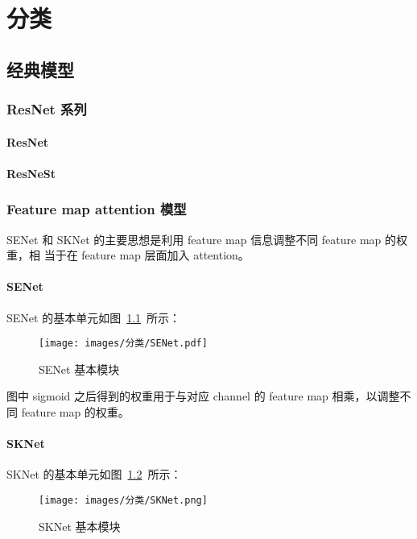 \part{分类}

\chapter{经典模型}

\section{ResNet 系列}

\subsection{ResNet}\label{subsec:ResNet}

\subsection{ResNeSt}

\section{Feature map attention 模型}
SENet 和 SKNet 的主要思想是利用 feature map 信息调整不同 feature map 的权重，相
当于在 feature map 层面加入 attention。

\subsection{SENet}\label{subsec:SENet}
SENet 的基本单元如图~\ref{fig:senet}~所示：

\begin{figure}[ht]
  \centering
  \texttt{[image: images/分类/SENet.pdf]}
  \caption{SENet 基本模块}\label{fig:senet}
\end{figure}

图中 sigmoid 之后得到的权重用于与对应 channel 的 feature map 相乘，以调整不
同 feature map 的权重。

\subsection{SKNet}
SKNet 的基本单元如图~\ref{fig:sknet}~所示：

\begin{figure}[ht]
  \centering
  \texttt{[image: images/分类/SKNet.png]}
  \caption{SKNet 基本模块}\label{fig:sknet}
\end{figure}


